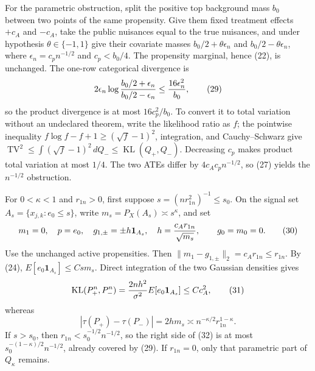 For the parametric obstruction, split the positive top background mass \(b_0\) between two points of the same propensity.  Give them fixed treatment effects \(+c_A\) and \(-c_A\), take the public nuisances equal to the true nuisances, and under hypothesis \(\theta\in\{-1,1\}\) give their covariate masses \(b_0/2+\theta\epsilon_n\) and \(b_0/2-\theta\epsilon_n\), where \(\epsilon_n=c_pn^{-1/2}\) and \(c_p<b_0/4\).  The propensity marginal, hence (22), is unchanged.  The one-row categorical divergence is
\[
2\epsilon_n\log {b_0/2+\epsilon_n\over b_0/2-\epsilon_n}
\leq {16\epsilon_n^2\over b_0},                                           \tag{29}
\]
so the product divergence is at most \(16c_p^2/b_0\).  To convert it to total variation without an undeclared theorem, write the likelihood ratio as \(f\); the pointwise inequality \(f\log f-f+1\geq(\sqrt f-1)^2\), integration, and Cauchy--Schwarz give \(\operatorname{TV}^2\leq\int(\sqrt f-1)^2\,dQ_-\leq\operatorname{KL}(Q_+,Q_-)\).  Decreasing \(c_p\) makes product total variation at most \(1/4\).  The two ATEs differ by \(4c_Ac_pn^{-1/2}\), so (27) yields the \(n^{-1/2}\) obstruction.

For \(0<\kappa<1\) and \(r_{1n}>0\), first suppose \(s=(nr_{1n}^2)^{-1}\leq s_0\).  On the signal set \(A_s=\{x_{j,k}:e_0\leq s\}\), write \(m_s=P_X(A_s)\asymp s^\kappa\), and set
\[
m_1=0,\quad p=e_0,\quad g_{1,\pm}=\pm h\mathbf 1_{A_s},\quad
h={c_A r_{1n}\over\sqrt{m_s}},\qquad g_0=m_0=0.                         \tag{30}
\]
Use the unchanged active propensities.  Then \(\|m_1-g_{1,\pm}\|_2=c_A r_{1n}\leq r_{1n}\).  By (24), \(E[e_0\mathbf 1_{A_s}]\leq Csm_s\).  Direct integration of the two Gaussian densities gives
\[
\operatorname{KL}(P_+^n,P_-^n)
={2nh^2\over\sigma^2}E[e_0\mathbf 1_{A_s}]
\leq Cc_A^2,                                                            \tag{31}
\]
whereas
\[
|\tau(P_+)-\tau(P_-)|=2hm_s
\asymp n^{-\kappa/2}r_{1n}^{1-\kappa}.                                  \tag{32}
\]
If \(s>s_0\), then \(r_{1n}<s_0^{-1/2}n^{-1/2}\), so the right side of (32) is at most \(s_0^{-(1-\kappa)/2}n^{-1/2}\), already covered by (29).  If \(r_{1n}=0\), only that parametric part of \(Q_\kappa\) remains.

